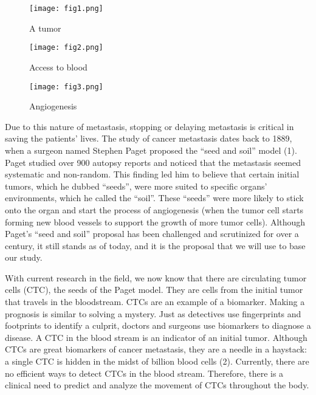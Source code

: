 \documentclass[letterpaper,12pt]{article}
\begin{document}
\begin{figure}
\centering
\begin{minipage}{.3\textwidth}
  \centering
  \texttt{[image: fig1.png]}
\caption{A tumor}
\end{minipage}
\begin{minipage}{.3\textwidth}
  \centering
  \texttt{[image: fig2.png]}
\caption{Access to blood}
\end{minipage}
\begin{minipage}{.3\textwidth}
  \centering
  \texttt{[image: fig3.png]}
  \caption{Angiogenesis}
\end{minipage}
\end{figure}

Due to this nature of metastasis, stopping or delaying metastasis is critical in saving the patients’ lives. The study of cancer metastasis dates back to 1889, when a surgeon named Stephen Paget proposed the ``seed and soil'' model (1). Paget studied over 900 autopsy reports and noticed that the metastasis seemed systematic and non-random. This finding led him to believe that certain initial tumors, which he dubbed “seeds”, were more suited to specific organs’ environments, which he called the ``soil''. These ``seeds'' were more likely to stick onto the organ and start the process of angiogenesis (when the tumor cell starts forming new blood vessels to support the growth of more tumor cells). Although Paget's ``seed and soil'' proposal has been challenged and scrutinized for over a century, it still stands as of today, and it is the proposal that we will use to base our study.

With current research in the field, we now know that there are circulating tumor cells (CTC), the seeds of the Paget model. They are cells from the initial tumor that travels in the bloodstream. CTCs are an example of a biomarker. Making a prognosis is similar to solving a mystery. Just as detectives use fingerprints and footprints to identify a culprit, doctors and surgeons use biomarkers to diagnose a disease. A CTC in the blood stream is an indicator of an initial tumor. Although CTCs are great biomarkers of cancer metastasis, they are a needle in a haystack: a single CTC is hidden in the midst of billion blood cells (2). Currently, there are no efficient ways to detect CTCs in the blood stream. Therefore, there is a clinical need to predict and analyze the movement of CTCs throughout the body.
\end{document}
